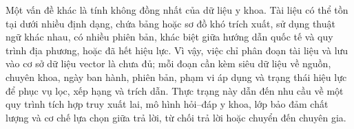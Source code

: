 Một vấn đề khác là tính không đồng nhất của dữ liệu y khoa. Tài liệu có thể tồn tại dưới nhiều định dạng, chứa bảng hoặc sơ đồ khó trích xuất, sử dụng thuật ngữ khác nhau, có nhiều phiên bản, khác biệt giữa hướng dẫn quốc tế và quy trình địa phương, hoặc đã hết hiệu lực. Vì vậy, việc chỉ phân đoạn tài liệu và lưu vào cơ sở dữ liệu vector là chưa đủ; mỗi đoạn cần kèm siêu dữ liệu về nguồn, chuyên khoa, ngày ban hành, phiên bản, phạm vi áp dụng và trạng thái hiệu lực để phục vụ lọc, xếp hạng và trích dẫn. Thực trạng này dẫn đến nhu cầu về một quy trình tích hợp truy xuất lai, mô hình hỏi--đáp y khoa, lớp bảo đảm chất lượng và cơ chế lựa chọn giữa trả lời, từ chối trả lời hoặc chuyển đến chuyên gia.






